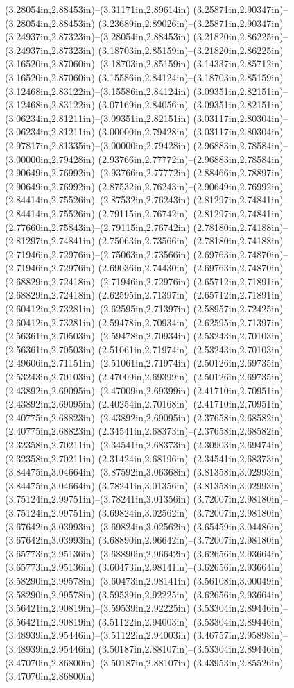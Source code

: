 (3.28054in,2.88453in)--(3.31171in,2.89614in) (3.25871in,2.90347in)--(3.28054in,2.88453in) (3.23689in,2.89026in)--(3.25871in,2.90347in) (3.24937in,2.87323in)--(3.28054in,2.88453in) (3.21820in,2.86225in)--(3.24937in,2.87323in) (3.18703in,2.85159in)--(3.21820in,2.86225in) (3.16520in,2.87060in)--(3.18703in,2.85159in) (3.14337in,2.85712in)--(3.16520in,2.87060in) (3.15586in,2.84124in)--(3.18703in,2.85159in) (3.12468in,2.83122in)--(3.15586in,2.84124in) (3.09351in,2.82151in)--(3.12468in,2.83122in) (3.07169in,2.84056in)--(3.09351in,2.82151in) (3.06234in,2.81211in)--(3.09351in,2.82151in) (3.03117in,2.80304in)--(3.06234in,2.81211in) (3.00000in,2.79428in)--(3.03117in,2.80304in) (2.97817in,2.81335in)--(3.00000in,2.79428in) (2.96883in,2.78584in)--(3.00000in,2.79428in) (2.93766in,2.77772in)--(2.96883in,2.78584in) (2.90649in,2.76992in)--(2.93766in,2.77772in) (2.88466in,2.78897in)--(2.90649in,2.76992in) (2.87532in,2.76243in)--(2.90649in,2.76992in) (2.84414in,2.75526in)--(2.87532in,2.76243in) (2.81297in,2.74841in)--(2.84414in,2.75526in) (2.79115in,2.76742in)--(2.81297in,2.74841in) (2.77660in,2.75843in)--(2.79115in,2.76742in) (2.78180in,2.74188in)--(2.81297in,2.74841in) (2.75063in,2.73566in)--(2.78180in,2.74188in) (2.71946in,2.72976in)--(2.75063in,2.73566in) (2.69763in,2.74870in)--(2.71946in,2.72976in) (2.69036in,2.74430in)--(2.69763in,2.74870in) (2.68829in,2.72418in)--(2.71946in,2.72976in) (2.65712in,2.71891in)--(2.68829in,2.72418in) (2.62595in,2.71397in)--(2.65712in,2.71891in) (2.60412in,2.73281in)--(2.62595in,2.71397in) (2.58957in,2.72425in)--(2.60412in,2.73281in) (2.59478in,2.70934in)--(2.62595in,2.71397in) (2.56361in,2.70503in)--(2.59478in,2.70934in) (2.53243in,2.70103in)--(2.56361in,2.70503in) (2.51061in,2.71974in)--(2.53243in,2.70103in) (2.49606in,2.71151in)--(2.51061in,2.71974in) (2.50126in,2.69735in)--(2.53243in,2.70103in) (2.47009in,2.69399in)--(2.50126in,2.69735in) (2.43892in,2.69095in)--(2.47009in,2.69399in) (2.41710in,2.70951in)--(2.43892in,2.69095in) (2.40254in,2.70168in)--(2.41710in,2.70951in) (2.40775in,2.68823in)--(2.43892in,2.69095in) (2.37658in,2.68582in)--(2.40775in,2.68823in) (2.34541in,2.68373in)--(2.37658in,2.68582in) (2.32358in,2.70211in)--(2.34541in,2.68373in) (2.30903in,2.69474in)--(2.32358in,2.70211in) (2.31424in,2.68196in)--(2.34541in,2.68373in) (3.84475in,3.04664in)--(3.87592in,3.06368in) (3.81358in,3.02993in)--(3.84475in,3.04664in) (3.78241in,3.01356in)--(3.81358in,3.02993in) (3.75124in,2.99751in)--(3.78241in,3.01356in) (3.72007in,2.98180in)--(3.75124in,2.99751in) (3.69824in,3.02562in)--(3.72007in,2.98180in) (3.67642in,3.03993in)--(3.69824in,3.02562in) (3.65459in,3.04486in)--(3.67642in,3.03993in) (3.68890in,2.96642in)--(3.72007in,2.98180in) (3.65773in,2.95136in)--(3.68890in,2.96642in) (3.62656in,2.93664in)--(3.65773in,2.95136in) (3.60473in,2.98141in)--(3.62656in,2.93664in) (3.58290in,2.99578in)--(3.60473in,2.98141in) (3.56108in,3.00049in)--(3.58290in,2.99578in) (3.59539in,2.92225in)--(3.62656in,2.93664in) (3.56421in,2.90819in)--(3.59539in,2.92225in) (3.53304in,2.89446in)--(3.56421in,2.90819in) (3.51122in,2.94003in)--(3.53304in,2.89446in) (3.48939in,2.95446in)--(3.51122in,2.94003in) (3.46757in,2.95898in)--(3.48939in,2.95446in) (3.50187in,2.88107in)--(3.53304in,2.89446in) (3.47070in,2.86800in)--(3.50187in,2.88107in) (3.43953in,2.85526in)--(3.47070in,2.86800in) 